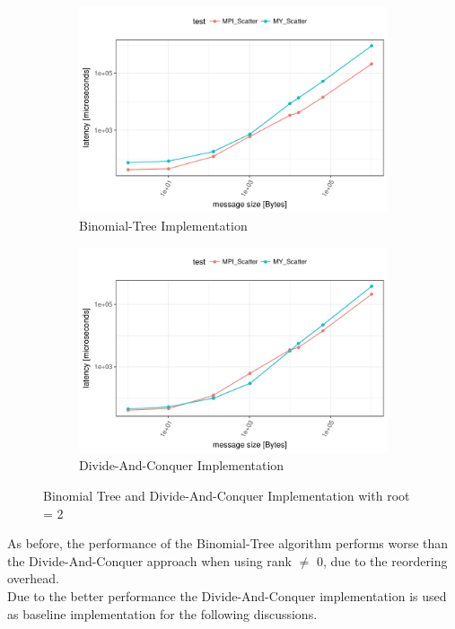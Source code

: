 \begin{figure}[H]
  \centering
  \begin{subfigure}[b]{0.49\textwidth}
        \includegraphics[width=\textwidth]{../benchmarks/openmpi/root=2/binom/scatter_32/runtime.pdf}
        \caption{Binomial-Tree Implementation}
    \end{subfigure}
    \begin{subfigure}[b]{0.49\textwidth}
        \includegraphics[width=\textwidth]{../benchmarks/openmpi/root=2/divide_conquer/scatter_32/runtime.pdf}
        \caption{Divide-And-Conquer Implementation}
    \end{subfigure}
    \caption{Binomial Tree and Divide-And-Conquer Implementation with root = 2}
    \label{fig:scatter:binom_vs_dac}
\end{figure}

As before, the performance of the Binomial-Tree algorithm performs worse than the Divide-And-Conquer approach when using rank $\neq$ 0, due to the reordering overhead.\\
Due to the better performance the Divide-And-Conquer implementation is used as baseline implementation for the following discussions.


